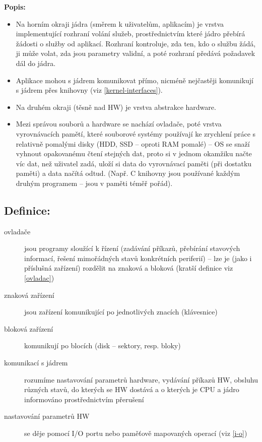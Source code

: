 \documentclass[a4paper, 11pt]{article}
\begin{document}
\textbf{Popis:}
\begin{itemize}
    \item Na horním okraji jádra (směrem k uživatelům, aplikacím) je vrstva implementující rozhraní volání služeb, prostřednictvím které jádro přebírá žádosti o služby od aplikací. Rozhraní kontroluje, zda ten, kdo o službu žádá, ji může volat, zda jsou parametry validní, a poté rozhraní předává požadavek dál do jádra.
    
    \item Aplikace mohou s jádrem komunikovat přímo, nicméně nejčastěji komunikují s jádrem přes knihovny (viz \ref{kernel-interfaces}).
    
    \item Na druhém okraji (těsně nad HW) je vrstva abstrakce hardware.
    
    \item Mezi správou souborů a hardware se nachází ovladače, poté vrstva vyrovnávacích pamětí, které souborové systémy používají ke zrychlení práce s relativně pomalými disky (HDD, SSD -- oproti RAM pomalé) -- OS se snaží vyhnout opakovanému čtení stejných dat, proto si v jednom okamžiku načte víc dat, než uživatel zadá, uloží si data do vyrovnávací paměti (při dostatku paměti) a data načítá odtud. (Např. C knihovny jsou používané každým druhým programem -- jsou v paměti téměř pořád).
\end{itemize}

\subsection*{Definice:} \label{ovladace}
\begin{description}
\item[ovladače] jsou programy sloužící k řízení (zadávání příkazů, přebírání stavových informací, řešení mimořádných stavů konkrétních periferií) -- lze je (jako i příslušná zařízení) rozdělit na znaková a bloková (kratší definice viz \ref{ovladac})

\item[znaková zařízení] jsou zařízení komunikující po jednotlivých znacích (klávesnice)

\item[bloková zařízení] komunikují po blocích (disk -- sektory, resp. bloky)

\item[komunikací s jádrem] rozumíme nastavování parametrů hardware, vydávání příkazů HW, obsluhu různých stavů, do kterých se HW dostává a o kterých je CPU a jádro informováno prostřednictvím přerušení

\item[nastavování parametrů HW] se děje pomocí I/O portu nebo paměťově mapovaných operací (viz \ref{i-o})
\end{description}
\end{document}
